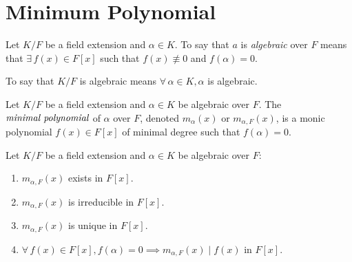 \documentclass[letterpaper,12pt,fleqn]{article}
\renewcommand{\a}{\alpha}
\begin{document}
\section*{Minimum Polynomial}

\begin{definition}[Algebraic]
  Let $K/F$ be a field extension and $\a\in K$. To say that $a$ is \emph{algebraic} over
  $F$ means that $\exists\,f(x)\in F[x]$ such that $f(x)\not\equiv0$ and $f(\a)=0$.

  To say that $K/F$ is algebraic means $\forall\,\a\in K,\a$ is algebraic.
\end{definition}

\begin{definition}
  Let $K/F$ be a field extension and $\a\in K$ be algebraic over $F$. The
  $\emph{minimal polynomial}$ of $\a$ over $F$, denoted $m_{\a}(x)$ or $m_{\a,F}(x)$, is a
  monic polynomial $f(x)\in F[x]$ of minimal degree such that $f(\a)=0$.
\end{definition}

\begin{theorem}
  Let $K/F$ be a field extension and $\a\in K$ be algebraic over $F$:
  \begin{enumerate}
  \item $m_{\a,F}(x)$ exists in $F[x]$.
  \item $m_{\a,F}(x)$ is irreducible in $F[x]$.
  \item $m_{\a,F}(x)$ is unique in $F[x]$.
  \item $\forall\,f(x)\in F[x],f(\a)=0\implies m_{\a,F}(x)\mid f(x)$ in $F[x]$.
  \end{enumerate}
\end{theorem}
\end{document}
